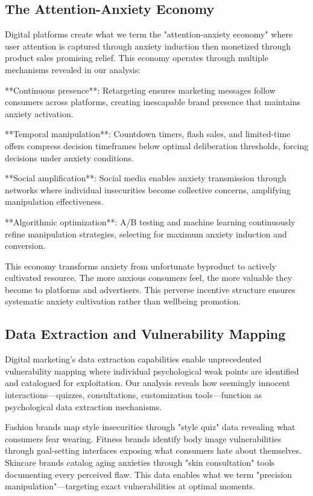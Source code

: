 \subsection{The Attention-Anxiety Economy}

Digital platforms create what we term the "attention-anxiety economy" where user attention is captured through anxiety induction then monetized through product sales promising relief. This economy operates through multiple mechanisms revealed in our analysis:

**Continuous presence**: Retargeting ensures marketing messages follow consumers across platforms, creating inescapable brand presence that maintains anxiety activation.

**Temporal manipulation**: Countdown timers, flash sales, and limited-time offers compress decision timeframes below optimal deliberation thresholds, forcing decisions under anxiety conditions.

**Social amplification**: Social media enables anxiety transmission through networks where individual insecurities become collective concerns, amplifying manipulation effectiveness.

**Algorithmic optimization**: A/B testing and machine learning continuously refine manipulation strategies, selecting for maximum anxiety induction and conversion.

This economy transforms anxiety from unfortunate byproduct to actively cultivated resource. The more anxious consumers feel, the more valuable they become to platforms and advertisers. This perverse incentive structure ensures systematic anxiety cultivation rather than wellbeing promotion.

\subsection{Data Extraction and Vulnerability Mapping}

Digital marketing's data extraction capabilities enable unprecedented vulnerability mapping where individual psychological weak points are identified and catalogued for exploitation. Our analysis reveals how seemingly innocent interactions—quizzes, consultations, customization tools—function as psychological data extraction mechanisms.

Fashion brands map style insecurities through "style quiz" data revealing what consumers fear wearing. Fitness brands identify body image vulnerabilities through goal-setting interfaces exposing what consumers hate about themselves. Skincare brands catalog aging anxieties through "skin consultation" tools documenting every perceived flaw. This data enables what we term "precision manipulation"—targeting exact vulnerabilities at optimal moments.

